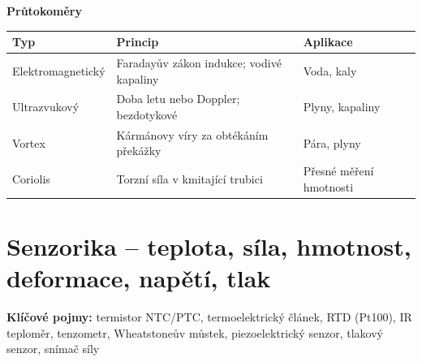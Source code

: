 \documentclass[a4paper,10pt]{article}
\begin{document}
\begin{vysvetlenibox}
\textbf{Průtokoměry}

\begin{center}
\begin{tabularx}{0.95\linewidth}{@{} l X l @{}}
    \toprule
    \textbf{Typ} & \textbf{Princip} & \textbf{Aplikace} \\
    \midrule
    Elektromagnetický & Faradayův zákon indukce; vodivé kapaliny & Voda, kaly \\
    Ultrazvukový      & Doba letu nebo Doppler; bezdotykové & Plyny, kapaliny \\
    Vortex            & Kármánovy víry za obtékáním překážky & Pára, plyny \\
    Coriolis          & Torzní síla v kmitající trubici & Přesné měření hmotnosti \\
    \bottomrule
\end{tabularx}
\end{center}
\end{vysvetlenibox}

\section{Senzorika -- teplota, síla, hmotnost, deformace, napětí, tlak}

\begin{pojmybox}
\textbf{Klíčové pojmy:}
termistor NTC/PTC, termoelektrický článek, RTD (Pt100),
IR teploměr, tenzometr, Wheatstoneův můstek, piezoelektrický senzor,
tlakový senzor, snímač síly
\end{pojmybox}
\end{document}
